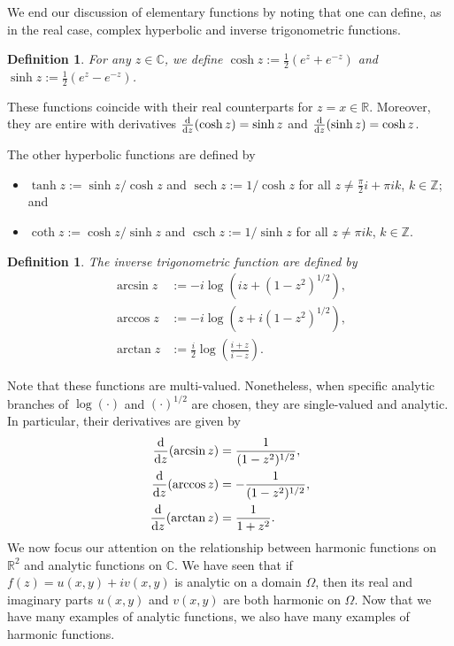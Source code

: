 \documentclass[10pt]{article}
\newcommand{\R}{\mathbb{R}}
\newcommand{\C}{\mathbb{C}}
\newcommand{\Z}{\mathbb{Z}}
\newcommand{\ddz}{\frac{\rm d}{{\rm d}z}}
\DeclareMathOperator{\sech}{sech}
\DeclareMathOperator{\csch}{csch}
\theoremstyle{newstyle}
\newtheorem{defn}[thm]{Definition}
\begin{document}
We end our discussion of elementary functions by noting that one can define, as in the 
real case, complex hyperbolic and inverse trigonometric functions.

\begin{defn}
For any $z \in \C$, we define $\cosh z := \frac12 (e^z + e^{-z})$ and 
$\sinh z := \frac12 (e^z - e^{-z})$. 
\end{defn}

These functions coincide with their real counterparts for $z = x \in \R$. Moreover, they are 
entire with derivatives $\ddz(\cosh z) = \sinh z$ and $\ddz(\sinh z) = \cosh z$. 

The other hyperbolic functions are defined by 
\begin{itemize}
    \item $\tanh z := \sinh z / \cosh z$ and $\sech z := 1/\cosh z$ for all 
    $z \neq \frac\pi2i + \pi ik$, $k \in \Z$; and 
    \item $\coth z := \cosh z / \sinh z$ and $\csch z := 1/\sinh z$ for all 
    $z \neq \pi ik$, $k \in \Z$. 
\end{itemize}

\begin{defn}
The inverse trigonometric function are defined by 
\begin{align*}
    \arcsin z &:= -i \log \left( iz + (1-z^2)^{1/2} \right), \\
    \arccos z &:= -i \log \left( z + i(1-z^2)^{1/2} \right), \\
    \arctan z &:= \frac{i}2 \log \left( \frac{i+z}{i-z} \right).
\end{align*}
\end{defn}

Note that these functions are multi-valued. Nonetheless, when specific analytic branches of 
$\log(\cdot)$ and $(\cdot)^{1/2}$ are chosen, they are single-valued and analytic. In 
particular, their derivatives are given by 
\begin{align*}
    \ddz(\arcsin z) &= \frac{1}{(1-z^2)^{1/2}}, \\
    \ddz(\arccos z) &= -\frac{1}{(1-z^2)^{1/2}}, \\
    \ddz(\arctan z) &= \frac{1}{1+z^2}.
\end{align*}
We now focus our attention on the relationship between harmonic functions on $\R^2$ and 
analytic functions on $\C$. We have seen that if $f(z) = u(x, y) + iv(x, y)$ is analytic on a domain 
$\Omega$, then its real and imaginary parts $u(x, y)$ and $v(x, y)$ are both harmonic on $\Omega$. 
Now that we have many examples of analytic functions, we also have many examples of harmonic functions.
\end{document}
